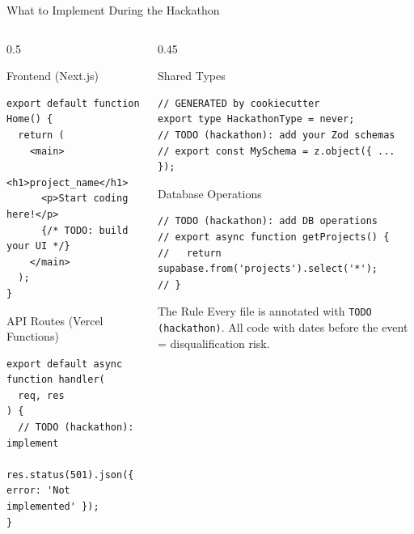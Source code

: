 \documentclass[10pt,aspectratio=169,t]{beamer}
\begin{document}
\begin{frame}{What to Implement During the Hackathon}

  \begin{columns}

    \begin{column}{0.5\paperwidth}

      \begin{block}{Frontend (Next.js)}
        \ttfamily\scriptsize
        \begin{verbatim}
export default function Home() {
  return (
    <main>
      <h1>project_name</h1>
      <p>Start coding here!</p>
      {/* TODO: build your UI */}
    </main>
  );
}
        \end{verbatim}
      \end{block}

      \begin{block}{API Routes (Vercel Functions)}
        \ttfamily\scriptsize
        \begin{verbatim}
export default async function handler(
  req, res
) {
  // TODO (hackathon): implement
  res.status(501).json({ error: 'Not implemented' });
}
        \end{verbatim}
      \end{block}

    \end{column}

    \begin{column}{0.45\paperwidth}

      \begin{block}{Shared Types}
        \ttfamily\scriptsize
        \begin{verbatim}
// GENERATED by cookiecutter
export type HackathonType = never;
// TODO (hackathon): add your Zod schemas
// export const MySchema = z.object({ ... });
        \end{verbatim}
      \end{block}

      \begin{block}{Database Operations}
        \ttfamily\scriptsize
        \begin{verbatim}
// TODO (hackathon): add DB operations
// export async function getProjects() {
//   return supabase.from('projects').select('*');
// }
        \end{verbatim}
      \end{block}

      \begin{alertblock}{The Rule}
        Every file is annotated with \texttt{TODO (hackathon)}. All code with dates before the event = disqualification risk.
      \end{alertblock}

    \end{column}

  \end{columns}

\end{frame}
\end{document}
